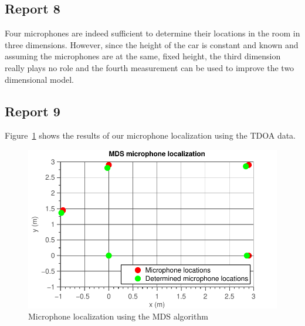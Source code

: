 \documentclass[11pt,titlepage]{report}
\begin{document}
\subsection{Report 8}
Four microphones are indeed sufficient to determine their locations in the room in three dimensions. However, since the height of the car is constant and known and assuming the microphones are at the same, fixed height, the third dimension really plays no role and the fourth measurement can be used to improve the two dimensional model.

\subsection{Report 9}
\label{subsec:ass-2-rep-9}
Figure~\ref{fig:ass-2-rep-9} shows the results of our microphone localization using the TDOA data.

\begin{figure}[H]
	\begin{center}
		\includegraphics[width=.6\linewidth]{../../deliverable-7-resources/figures/ass-2/report-9/ass-2-report-9.pdf}
	\end{center}
	\caption{Microphone localization using the MDS algorithm}
	\label{fig:ass-2-rep-9}
\end{figure}
	
\end{document}
